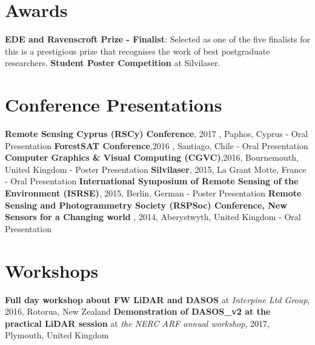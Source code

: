 \documentclass[11pt,nofootinbib]{report}
\begin{document}
	
	\section{Awards}
		\textbf{EDE and Ravenscroft Prize - Finalist}: Selected as one of the five finalists for this is a prestigious prize that recognises the work of best postgraduate researchers.\newline
		\textbf{Student Poster Competition} at Silvilaser.
		
	
	\section{Conference Presentations}
	    \textbf{Remote Sensing Cyprus (RSCy) Conference},  2017 , Paphos, Cyprus - Oral Presentation \newline
		\textbf{ForestSAT Conference},2016 , Santiago, Chile - Oral Presentation \newline
		\textbf{Computer Graphics \& Visual Computing (CGVC)},2016, Bournemouth, United Kingdom - Poster Presentation \newline
		\textbf{Silvilaser}, 2015, La Grant Motte, France - Oral Presentation \newline
		\textbf{International Symposium of Remote Sensing of the Environment 	(ISRSE)}, 2015, Berlin, German - Poster Presentation\newline
		\textbf{Remote Sensing and Photogrammetry Society (RSPSoc) Conference, New Sensors for a Changing world} , 2014, Aberystwyth, United Kingdom - Oral Presentation \newline
	
	 
	\section{Workshops}
		\textbf{Full day workshop about FW LiDAR and DASOS} at \textit{Interpine Ltd Group}, 2016, Rotorua, New Zealand \newline
		\textbf{Demonstration of DASOS\_v2 at the practical LiDAR session} at \textit{ the NERC ARF annual workshop}, 2017, Plymouth, United Kingdom \newline


 
       
  
       	
       	
	\setcounter{secnumdepth}{1}
   	\setcounter{tocdepth}{1}
    \tableofcontents	 

		\newpage  
	\cleardoublepage
	
\end{document}
